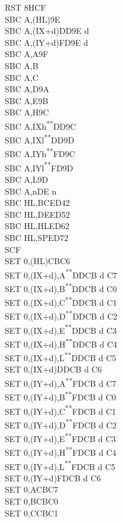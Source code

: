 \documentclass[12pt,twoside,openright,a4paper]{book}
\newcommand{\UNDOC}{\textnormal{\textsuperscript{**}}}
\begin{document}
\begin{multicols}{3}
{\begin{tabbing}
	RST 8H\>CF\\
	SBC A,(HL)\>9E\\
	SBC A,(IX+d)\>DD9E d\\
	SBC A,(IY+d)\>FD9E d\\
	SBC A,A\>9F\\
	SBC A,B\\
	SBC A,C\\
	SBC A,D\>9A\\
	SBC A,E\>9B\\
	SBC A,H\>9C\\
	SBC A,IXh\UNDOC\>DD9C\\
	SBC A,IXl\UNDOC\>DD9D\\
	SBC A,IYh\UNDOC\>FD9C\\
	SBC A,IYl\UNDOC\>FD9D\\
	SBC A,L\>9D\\
	SBC A,n\>DE n\\
	SBC HL,BC\>ED42\\
	SBC HL,DE\>ED52\\
	SBC HL,HL\>ED62\\
	SBC HL,SP\>ED72\\
	SCF\\
	SET 0,(HL)\>CBC6\\
	SET 0,(IX+d),A\UNDOC\>DDCB d C7\\
	SET 0,(IX+d),B\UNDOC\>DDCB d C0\\
	SET 0,(IX+d),C\UNDOC\>DDCB d C1\\
	SET 0,(IX+d),D\UNDOC\>DDCB d C2\\
	SET 0,(IX+d),E\UNDOC\>DDCB d C3\\
	SET 0,(IX+d),H\UNDOC\>DDCB d C4\\
	SET 0,(IX+d),L\UNDOC\>DDCB d C5\\
	SET 0,(IX+d)\>DDCB d C6\\
	SET 0,(IY+d),A\UNDOC\>FDCB d C7\\
	SET 0,(IY+d),B\UNDOC\>FDCB d C0\\
	SET 0,(IY+d),C\UNDOC\>FDCB d C1\\
	SET 0,(IY+d),D\UNDOC\>FDCB d C2\\
	SET 0,(IY+d),E\UNDOC\>FDCB d C3\\
	SET 0,(IY+d),H\UNDOC\>FDCB d C4\\
	SET 0,(IY+d),L\UNDOC\>FDCB d C5\\
	SET 0,(IY+d)\>FDCB d C6\\
	SET 0,A\>CBC7\\
	SET 0,B\>CBC0\\
	SET 0,C\>CBC1\\

\end{tabbing}}
\end{multicols}
\end{document}
